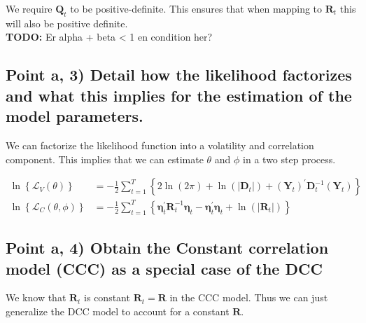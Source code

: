 \documentclass{article}
\begin{document}
We require $\boldsymbol{Q}_{t}$ to be positive-definite. This ensures
that when mapping to $\mathbf{R}_{t}$ this will also be positive
definite.\\

\textbf{TODO: }Er alpha + beta \textless{} 1 en condition her?

\subsection{Point a, 3) Detail how the likelihood factorizes and what this implies
for the estimation of the model parameters.}

We can factorize the likelihood function into a volatility and correlation
component. This implies that we can estimate $\theta$ and $\phi$
in a two step process.

\begin{align*}
\ln\left\{ \mathcal{L}_{V}\left(\theta\right)\right\}  & =-\frac{1}{2}\sum_{t=1}^{T}\left\{ 2\ln\left(2\pi\right)+\ln\left(\left\rvert \mathbf{D}_{t}\right\rvert \right)+\left(\mathbf{Y}_{t}\right)^{\prime}\mathbf{D}_{t}^{-1}\left(\mathbf{Y}_{t}\right)\right\} \\
\ln\left\{ \mathcal{L}_{C}\left(\theta,\phi\right)\right\}  & =-\frac{1}{2}\sum_{t=1}^{T}\left\{ \boldsymbol{\eta}_{t}^{\prime}\mathbf{R}_{t}^{-1}\boldsymbol{\eta}_{t}-\boldsymbol{\eta}_{t}^{\prime}\boldsymbol{\eta}_{t}+\ln\left(\left\rvert \mathbf{R}_{t}\right\rvert \right)\right\} 
\end{align*}


\subsection{Point a, 4) Obtain the Constant correlation model (CCC) as a special
case of the DCC}

We know that $\mathbf{R}_{t}$ is constant $\mathbf{R}_{t}=\mathbf{R}$
in the CCC model. Thus we can just generalize the DCC model to account
for a constant $\mathbf{R}$.
\end{document}
